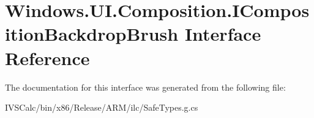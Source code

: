 \hypertarget{interface_windows_1_1_u_i_1_1_composition_1_1_i_composition_backdrop_brush}{}\section{Windows.\+U\+I.\+Composition.\+I\+Composition\+Backdrop\+Brush Interface Reference}
\label{interface_windows_1_1_u_i_1_1_composition_1_1_i_composition_backdrop_brush}


The documentation for this interface was generated from the following file\+:\begin{DoxyCompactItemize}
\item 
I\+V\+S\+Calc/bin/x86/\+Release/\+A\+R\+M/ilc/Safe\+Types.\+g.\+cs\end{DoxyCompactItemize}
